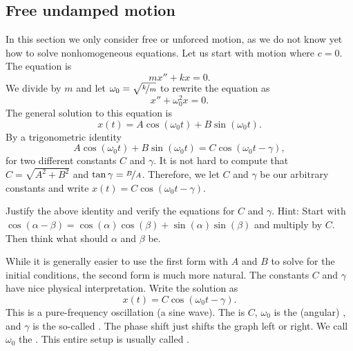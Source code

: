 \subsection{Free undamped motion}

In this section we only consider free or unforced motion,
as we do not know yet how to solve nonhomogeneous equations.  Let us start with
 motion where $c=0$.  The equation is
\begin{equation*}
mx'' + kx = 0 .
\end{equation*}
We divide by $m$ and let $\omega_0 = \sqrt{\nicefrac{k}{m}}$ to rewrite the equation as
\begin{equation*}
x'' + \omega_0^2 x = 0 .
\end{equation*}
The general solution to this equation is
\begin{equation*}
x(t) = A \cos (\omega_0 t) + B \sin (\omega_0 t) .
\end{equation*}
By a trigonometric identity
\begin{equation*}
A \cos (\omega_0 t) + B \sin (\omega_0 t) =
C \cos ( \omega_0 t - \gamma ) ,
\end{equation*}
for two different constants $C$ and $\gamma$.
It is not hard to compute that $C= \sqrt{A^2 + B^2}$ and $\tan \gamma =
\nicefrac{B}{A}$.  Therefore, we let
$C$ and $\gamma$ be our arbitrary constants and write
$x(t) = C \cos ( \omega_0 t - \gamma )$.

\begin{exercise}
Justify the above identity and verify the equations for $C$
and $\gamma$.  Hint: Start with
$\cos (\alpha-\beta) = \cos (\alpha) \cos
(\beta) + \sin (\alpha)\sin (\beta)$ and multiply by $C$.  Then think what should
$\alpha$ and $\beta$ be.
\end{exercise}

While it is generally easier to use the first form with $A$ and $B$
to solve for the initial conditions, the second form is much
more natural.  The constants $C$ and $\gamma$ have nice physical interpretation.
Write the solution as
\begin{equation*}
x(t) = C \cos ( \omega_0 t - \gamma ) .
\end{equation*}
This is a pure-frequency oscillation (a sine wave).
The \emph{} is $C$, $\omega_0$ is the (angular)
\emph{},
and $\gamma$ is the so-called \emph{}.
The phase shift just shifts the
graph left or right.
We call $\omega_0$ the \emph{}.
This entire setup is usually  
called \emph{}.

